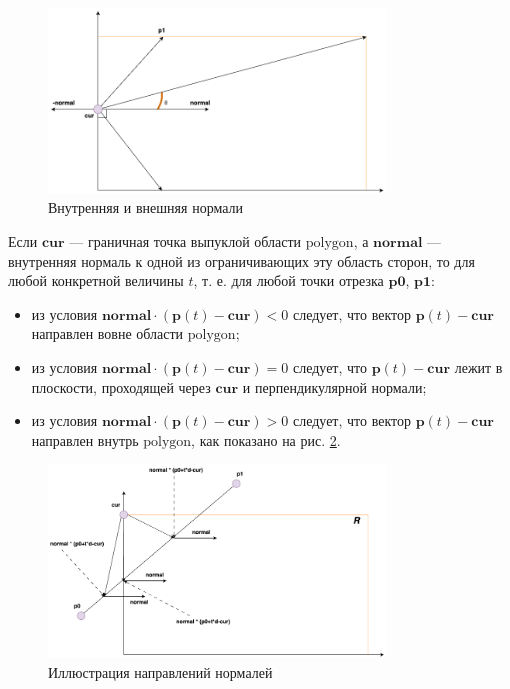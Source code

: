 \documentclass[areasetadvanced]{scrartcl}
\begin{document}
\begin{figure}[H]
    \centering
    \includegraphics[width=0.8\textwidth]{../images/Normal.png}
    \caption{Внутренняя и внешняя нормали}
    \label{fig:syntdiag}
\end{figure}

Если \(\mathbf{cur}\) — граничная точка выпуклой области \(\text{polygon}\), а \(\mathbf{normal}\) — внутренняя нормаль к одной из ограничивающих эту область сторон, то для любой конкретной величины \(t\), т. е. для любой точки отрезка \(\mathbf{p0}\), \(\mathbf{p1}\):
\begin{itemize}
    \item из условия \(\mathbf{normal} \cdot (\mathbf{p}(t) - \mathbf{cur}) < 0\) следует, что вектор \(\mathbf{p}(t) - \mathbf{cur}\) направлен вовне области \(\text{polygon}\);
    \item из условия \(\mathbf{normal} \cdot (\mathbf{p}(t) - \mathbf{cur}) = 0\) следует, что \(\mathbf{p}(t) - \mathbf{cur}\) лежит в плоскости, проходящей через \(\mathbf{cur}\) и перпендикулярной нормали;
    \item из условия \(\mathbf{normal} \cdot (\mathbf{p}(t) - \mathbf{cur}) > 0\) следует, что вектор \(\mathbf{p}(t) - \mathbf{cur}\) направлен внутрь \(\text{polygon}\), как показано на рис. \ref{fig:normal2}.
\end{itemize}

\begin{figure}[H]
    \centering
    \includegraphics[width=0.8\textwidth]{../images/Normal2.png}
    \caption{Иллюстрация направлений нормалей}
    \label{fig:normal2}
\end{figure}
\end{document}
